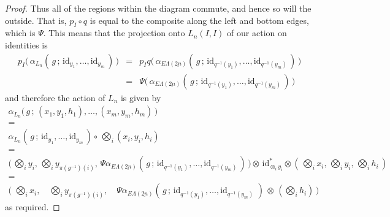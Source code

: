 \documentclass{amsbook} %
\newcommand{\id}{\textrm{id}}
\newcommand{\ELnn}{E\Lambda(\underline{2n})}
\numberwithin{section}{chapter}
\begin{document}
\begin{proof}
Thus all of the regions within the diagram commute, and hence so will the outside. That is, $p_I \circ q$ is equal to the composite along the left and bottom edges, which is $\Psi$. This means that the projection onto $L_n(I,I)$ of our action on identities is
\[ \begin{array}{rll}
			p_I \big( \, \alpha_{L_n}( \, g \, ; \, \id_{y_1}, \ldots, \id_{y_m} \, ) \, \big) & = &  p_I q\big( \, \alpha_{\ELnn}( \, g \, ; \, \id_{q^{-1}(y_1)}, \ldots, \id_{q^{-1}(y_m)} \, ) \, \big) \\
			& = & \Psi \big( \, \alpha_{\ELnn}( \, g \, ; \, \id_{q^{-1}(y_1)}, \ldots, \id_{q^{-1}(y_m)} \, ) \, \big)
		\end{array}
\]
and therefore the action of $L_n$ is given by
\[ \begin{array}{c}
			\alpha_{L_n}\big( \, g \, ; \, (x_1, y_1, h_1), \ldots, (x_m, y_m, h_m) \, \big) \\
			= \\
			\alpha_{L_n}( \, g \, ; \, \id_{y_1}, \ldots, \id_{y_m} \, ) \circ \, \bigotimes_i (x_i, y_i, h_i) \\
			= \\
			\big( \, \bigotimes_i y_i, \, \bigotimes_i y_{\pi(g^{-1})(i)}, \, \Psi \alpha_{\ELnn}( \, g \, ; \, \id_{q^{-1}(y_1)}, \ldots, \id_{q^{-1}(y_m)} \, ) \, \big) \otimes \, \id_{\otimes_i y_i}^* \otimes ( \, \bigotimes_i x_i, \, \bigotimes_i y_i, \, \bigotimes_i h_i \, ) \\
			= \\
			\big( \, \, \bigotimes_i x_i, \quad \bigotimes_i y_{\pi(g^{-1})(i)}, \quad \Psi \alpha_{\ELnn}( \, g \, ; \, \id_{q^{-1}(y_1)}, \ldots, \id_{q^{-1}(y_m)} \, \, ) \, \otimes \, (\bigotimes_i h_i) \, \big) 
		\end{array}
\]
as required.
\end{proof}









\end{document}
